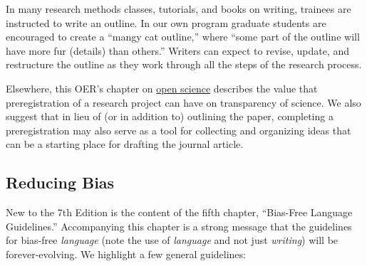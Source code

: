 \documentclass[
  11pt,
]{book}
\begin{document}
In many research methods classes, tutorials, and books on writing, trainees are instructed to write an outline. In our own program graduate students are encouraged to create a ``mangy cat outline,'' where ``some part of the outline will have more fur (details) than others.'' Writers can expect to revise, update, and restructure the outline as they work through all the steps of the research process.

Elsewhere, this OER's chapter on \protect\hyperlink{OpSci}{open science} describes the value that preregistration of a research project can have on transparency of science. We also suggest that in lieu of (or in addition to) outlining the paper, completing a preregistration may also serve as a tool for collecting and organizing ideas that can be a starting place for drafting the journal article.

\hypertarget{reducing-bias}{%
\subsection{Reducing Bias}\label{reducing-bias}}

New to the 7th Edition is the content of the fifth chapter, ``Bias-Free Language Guidelines.'' Accompanying this chapter is a strong message that the guidelines for bias-free \emph{language} (note the use of \emph{language} and not just \emph{writing}) will be forever-evolving. We highlight a few general guidelines:
\end{document}
